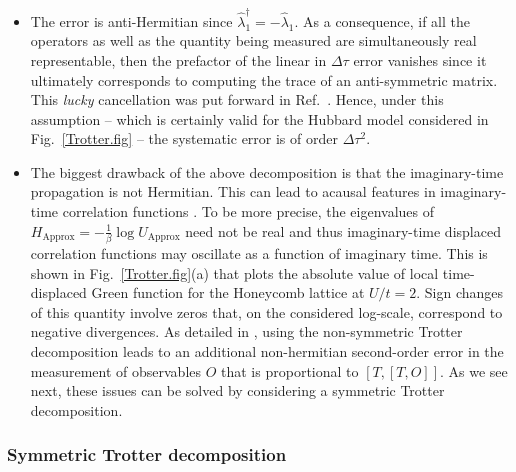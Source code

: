 \begin{itemize}
\item    The error is anti-Hermitian  since $\hat{\lambda}_1^{\dagger} = - \hat{\lambda}_1 $. As a consequence, if all the operators as well as the quantity being measured are simultaneously real representable,  then   the prefactor of the linear in $\Delta  \tau$ error vanishes since it ultimately corresponds to computing the trace of an  anti-symmetric matrix. This \textit{lucky}   cancellation was put forward in  Ref.~\cite{Fye86}.   Hence, under this assumption -- which is certainly valid for the Hubbard model considered in Fig.~\ref{Trotter.fig} -- the systematic error is of order $\Delta \tau^2$.
\item  The biggest drawback  of the above decomposition is that  the imaginary-time propagation is not Hermitian.   This can lead to acausal  features in imaginary-time correlation functions \cite{Beyl_thesis}. To be more precise, the eigenvalues of  
$  H_{\text{Approx}} = - \frac{1}{\beta} \log  U_{\text{Approx}}$ need not be real and thus imaginary-time displaced correlation functions may oscillate as a function of imaginary time.   
This is shown in  Fig.~\ref{Trotter.fig}(a)  that plots the  absolute value of local time-displaced Green function for  the Honeycomb lattice at $U/t=2$.  Sign changes of this quantity   involve zeros  that, on the considered log-scale,  correspond to negative divergences.
As detailed in \cite{goth2020}, using the non-symmetric Trotter decomposition 
leads to an additional   non-hermitian second-order error in the measurement of observables $O$
that is proportional to $[T,[T,O]]$.
As we see next, these issues can be solved by considering a symmetric  Trotter decomposition.
\end{itemize}


\subsubsection{Symmetric Trotter decomposition} 

